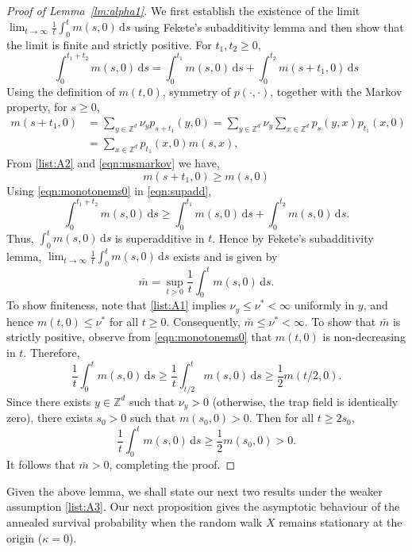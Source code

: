 \documentclass{article}[12pt]
\theoremstyle{definition}
\newcommand{\Z}{\mathbb{Z}}
\newcommand{\1}{\mathbbm{1}}
\newcommand{\dd }{\mathrm{d} }
\begin{document}
\begin{proof}[Proof of Lemma~\ref{lm:alpha1}]
We first establish the existence of the limit $\lim_{t\to\infty}\frac{1}{t}\int_0^tm(s,0)\, \dd s$ using Fekete's subadditivity lemma and then show that the limit is finite and strictly positive.
For $t_1,t_2 \ge 0$, 
\begin{equation}
    \int_0^{t_1+t_2} m(s,0) \, \dd s = \int_0^{t_1} m(s,0) \, \dd s + \int_{0}^{t_2} m(s+t_1,0) \, \dd s  \label{eqn:supadd}
\end{equation}
Using the definition of $m(t,0)$, symmetry of $p(\cdot,\cdot)$,
together with the Markov property, for $s\ge 0$,
\begin{align}
    m(s+t_1 ,0 ) &= \sum_{y\in \Z^d}\nu_y  p_{s+t_1}(y,0) = \sum_{y\in \Z^d}\nu_y  \sum_{x\in \Z^d} p_{s}(y,x) p_{t_1}(x,0)\nonumber\\
    &= \sum_{x\in \Z^d} p_{t_1}(x,0) m(s,x), \label{eqn:msmarkov}
\end{align}
From \ref{list:A2} and \eqref{eqn:msmarkov} we have,
\begin{equation}
    m(s+t_1,0) \ge m(s,0) \label{eqn:monotonems0}
\end{equation}
Using \eqref{eqn:monotonems0} in \eqref{eqn:supadd},
$$\int_0^{t_1+t_2} m(s,0) \, \dd s \ge \int_0^{t_1} m(s,0) \, \dd s + \int_{0}^{t_2} m(s,0) \, \dd s.$$
Thus, $\int_0^{t} m(s,0) \, \dd s$ is superadditive in $t$. Hence by Fekete's subadditivity lemma, $\lim_{t\to\infty}\frac{1}{t}\int_0^tm(s,0)\, \dd s$ exists and is given by 
$$\bar{m} = \sup_{t>0}\frac{1}{t}\int_0^t m(s,0)\, \dd s.$$
To show finiteness, note that \ref{list:A1} implies $\nu_y \le \nu^* <\infty$ uniformly in $y$, and hence $m(t,0) \le \nu^*$ for all $t\ge 0$. Consequently, $\bar{m}\le \nu^* < \infty$. To show that $\bar{m}$ is strictly positive, observe from \eqref{eqn:monotonems0} that $m(t,0)$ is non-decreasing in $t$. Therefore, 
$$\frac{1}{t}\int_0^tm(s,0)\, \dd s \ge \frac{1}{t}\int_{t/2}^tm(s,0)\, \dd s \ge \frac{1}{2}m(t/2,0).$$
Since there exists $y\in \Z^d$ such that $\nu_y >0$ (otherwise, the trap field is identically zero), there exists $s_0 >0$ such that $m(s_0,0)>0$. Then for all $t\ge 2s_0$, 
$$\frac{1}{t}\int_0^tm(s,0)\, \dd s \ge \frac{1}{2}m(s_0,0) >0.$$
It follows that $\bar{m}>0$, completing the proof. 
\end{proof}
Given the above lemma, we shall state our next two results under the weaker assumption \ref{list:A3}.
Our next proposition gives the asymptotic behaviour of the annealed survival probability when the random walk $X$ remains stationary at the origin ($\kappa=0$).
\end{document}
